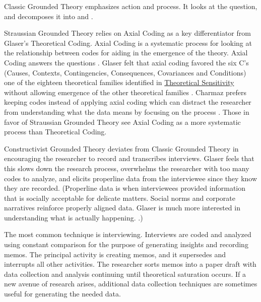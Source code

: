 Classic Grounded Theory emphasizes action and process. It looks at the question,  and decomposes it into  and  \cite{Charmaz}.

Straussian Grounded Theory relies on Axial Coding as a key differentiator from Glaser's Theoretical Coding. Axial Coding is a systematic process for looking at the relationship between codes for aiding in the emergence of the theory. Axial Coding answers the questions  \cite{Strauss1988Basics}. Glaser \cite{GlaserBasics} felt that axial coding favored the six C's  (Causes, Contexts, Contingencies, Consequences, Covariances and Conditions) one of the eighteen theoretical families identified in \underline{Theoretical Sensitivity} without allowing emergence of the other theoretical families \cite{GlaserTheoreticalSensitivity}. Charmaz prefers keeping codes  instead of applying axial coding which can distract the researcher from understanding what the data means by focusing on the process \cite{Charmaz}. Those in favor of Straussian Grounded Theory see Axial Coding as a more systematic process than Theoretical Coding. 

Constructivist Grounded Theory deviates from Classic Grounded Theory in encouraging the researcher to record and transcribes interviews. Glaser feels that this slows down the research process, overwhelms the researcher with too many codes to analyze, and elicits properline data from the interviewee since they know they are recorded. (Properline data is when interviewees provided information that is socially acceptable for delicate matters. Social norms and corporate narratives reinforce properly aligned data. Glaser is much more interested in understanding what is actually happening. \cite{GlaserAllIsData}.)


The most common technique is interviewing. Interviews are coded and analyzed using constant comparison for the purpose of generating insights and recording memos. The principal activity is creating memos, and it supersedes and interrupts all other activities. The researcher sorts memos into a paper draft with data collection and analysis continuing until theoretical saturation occurs. If a new avenue of research arises,  additional data collection techniques are sometimes useful for generating the needed data. 

